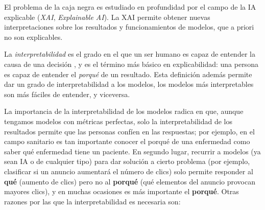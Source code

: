 \documentclass[12pt]{report} %
\begin{document}
El problema de la caja negra es estudiado en profundidad por el campo de la IA explicable (\textit{XAI}, \textit{Explainable AI}). La XAI permite obtener nuevas interpretaciones sobre los resultados y funcionamientos de modelos, que a priori no son explicables.

La \textit{interpretabilidad} es el grado en el que un ser humano es capaz de entender la causa de una decisión \cite{Miller2019}, y es el término más básico en explicabilidad: una persona es capaz de entender el \textit{porqué} de un resultado. Esta definición además permite dar un grado de interpretabilidad a los modelos, los modelos más interpretables son más fáciles de entender, y viceversa.

La importancia de la interpretabilidad de los modelos radica en que, aunque tengamos modelos con métricas perfectas, solo la interpretabilidad de los resultados permite que las personas confíen en las respuestas; por ejemplo, en el campo sanitario es tan importante conocer el porqué de una enfermedad como saber qué enfermedad tiene un paciente. En segundo lugar, recurrir a modelos (ya sean IA o de cualquier tipo) para dar solución a cierto problema (por ejemplo, clasificar si un anuncio aumentará el número de clics) solo permite responder al \textbf{qué} (aumento de clics) pero no al \textbf{porqué} (qué elementos del anuncio provocan mayores clics), y en muchas ocasiones es más importante el \textbf{porqué}. Otras razones por las que la interpretabilidad es necesaria son:
\end{document}
